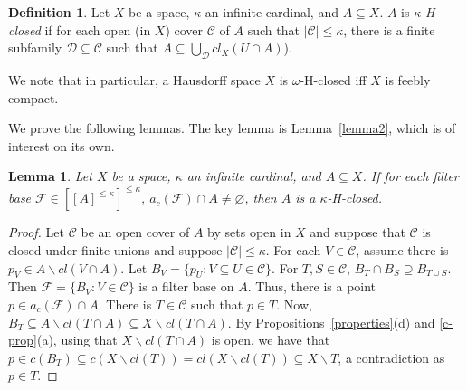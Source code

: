 \documentclass[11pt]{amsart}
\newif\ifdraft\draftfalse
\newtheorem{lemma}[theorem]{Lemma}
\theoremstyle{definition}
\newtheorem{definition}[theorem]{Definition}
\theoremstyle{remark}
\numberwithin{equation}{section}
\begin{document}
\begin{definition}{{\immediate{}}{\ifdraft\hspace{-\lastskip}\vadjust{\vspace{-1mm}\smash{\llap{{\tt {{kHcl}}}\hspace{8mm}}}\vspace{1mm}}\fi}}
Let $X$ be a space, ${\kappa}$ an infinite cardinal, and $A {\subseteq} X$.
$A$ is $\kappa$-\emph{H-closed} if for each open (in $X$) cover $\mathcal C$ of $A$ such that $|{\mathcal C}| \leq {\kappa}$, there is a finite subfamily $ {\mathcal D}\subseteq {\mathcal C}$ such that $A \subseteq \bigcup_{\mathcal D}cl_X(U \cap A)$).  
\end{definition}

We note that in particular, a Hausdorff space $X$ is $\omega$-H-closed iff $X$ is feebly compact. 

We prove the following lemmas. The key lemma is Lemma~\ref{lemma2}, which is of interest on its own.  

\begin{lemma}{{\immediate{}}{\ifdraft\hspace{-\lastskip}\vadjust{\vspace{-1mm}\smash{\llap{{\tt {{lemma1}}}\hspace{8mm}}}\vspace{1mm}}\fi}}
Let $X$ be a space, ${\kappa}$ an infinite cardinal, and $A \subseteq X$.  If for each filter base ${\mathcal F} \in [[A]^{\leq {\kappa}}]^{\leq {\kappa}}$, $a_c({{\ensuremath{\mathcal{F}}}}) \cap A \ne \varnothing$,  then $A$ is a  ${\kappa}$-H-closed.
\end{lemma}

\begin{proof} Let ${\ensuremath{\mathcal{C}}}$ be an open cover of $A$ by sets open in $X$ and suppose that ${\ensuremath{\mathcal{C}}}$ is closed under finite unions and suppose $|{{\ensuremath{\mathcal{C}}}}| \leq \kappa$.  For each $V \in {\ensuremath{\mathcal{C}}}$, assume there is $p_V \in A\backslash cl(V\cap A)$.  Let $B_V = \{p_U: V {\subseteq} U \in {\ensuremath{\mathcal{C}}}\}$.  For $T, S \in {\ensuremath{\mathcal{C}}}$, $B_T \cap B_S \supseteq B_{T\cup S}$.  Then ${\ensuremath{\mathcal{F}}} = \{B_V: V \in {\ensuremath{\mathcal{C}}}\}$ is a filter base on $A$.  Thus, there is a point $p \in a_c({\ensuremath{\mathcal{F}}}) \cap A$.  There is $T \in {\ensuremath{\mathcal{C}}}$ such that $p \in T$.  Now, $B_T {\subseteq} A\backslash cl(T\cap A) {\subseteq} X\backslash cl(T\cap A)$.  By Propositions~\ref{properties}(d) and \ref{c-prop}(a), using that $X\backslash cl(T\cap A)$ is open, we have that $ p \in c(B_T) {\subseteq} c(X\backslash cl(T)) = cl(X\backslash cl(T)) {\subseteq} X\backslash T$, a contradiction as $p \in T$.\end{proof}
\end{document}
